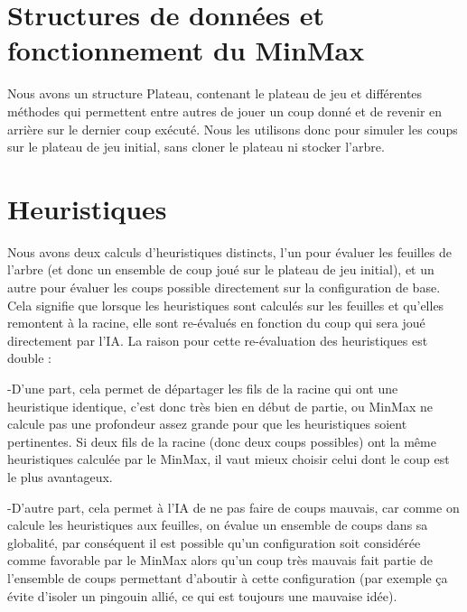 \documentclass{report}
\begin{document}
\section{Structures de données et fonctionnement du MinMax}
Nous avons un structure Plateau, contenant le plateau de jeu et différentes méthodes qui permettent entre autres de jouer un coup donné et de revenir en arrière sur le dernier coup exécuté.
\newline
Nous les utilisons donc pour simuler les coups sur le plateau de jeu initial, sans cloner le plateau ni stocker l'arbre.



\section{Heuristiques}
Nous avons deux calculs d'heuristiques distincts, l'un pour évaluer les feuilles de l'arbre (et donc un ensemble de coup joué sur le plateau de jeu initial), et un autre pour évaluer les coups possible directement sur la configuration de base.
\newline 
Cela signifie que lorsque les heuristiques sont calculés sur les feuilles et qu'elles remontent à la racine, elle sont re-évalués en fonction du coup qui sera joué directement par l'IA.
\newline
La raison pour cette re-évaluation des heuristiques est double :

\hspace{0.5cm}	-D'une part, cela permet de départager les fils de la racine qui ont une heuristique identique, c'est donc très bien en début de partie, ou MinMax ne calcule pas une profondeur assez grande pour que les heuristiques soient pertinentes. \newline
Si deux fils de la racine (donc deux coups possibles) ont la même heuristiques calculée par le MinMax, il vaut mieux choisir celui dont le coup est le plus avantageux.

\hspace{0.5cm}	-D'autre part, cela permet à l'IA de ne pas faire de coups mauvais, car comme on calcule les heuristiques aux feuilles, on évalue un ensemble de coups dans sa globalité, par conséquent il est possible qu'un configuration soit considérée comme favorable par le MinMax alors qu'un coup très mauvais fait partie de l'ensemble de coups permettant d'aboutir à cette configuration (par exemple ça évite d'isoler un pingouin allié, ce qui est toujours une mauvaise idée).
\end{document}
